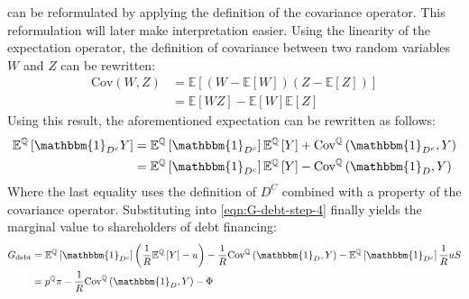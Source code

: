 \documentclass[../main.tex]{subfiles}
\begin{document}
        can be reformulated by applying the definition of the covariance operator.
        This reformulation will later make interpretation easier.
        Using the linearity of the expectation operator,
        the definition of covariance between two random variables $W$ and $Z$ can be rewritten:
            \begin{align}
                \text{Cov}\left(W, Z\right) &= 
                \mathbb{E}\left[
                    (W - \mathbb{E}\left[W\right])
                    (Z - \mathbb{E}\left[Z\right])
                \right] \nonumber\\
                &=
                \mathbb{E}\left[WZ\right]
                - \mathbb{E}\left[W\right] \mathbb{E}\left[Z\right] \nonumber
            \end{align}
        Using this result, the aforementioned expectation can be rewritten as follows:
            \begin{align}
                \mathbb{E}^{\mathbb{Q}}\left[
                    \mathbbm{1}_{D^{c}}Y
                \right]
                &=
                \mathbb{E}^{\mathbb{Q}}\left[\mathbbm{1}_{D^{c}}\right] 
                \mathbb{E}^{\mathbb{Q}}\left[Y\right] 
                + 
                \text{Cov}^{\mathbb{Q}}\left(\mathbbm{1}_{D^{c}}, Y\right) 
                \nonumber\\
                &=
                \mathbb{E}^{\mathbb{Q}}\left[\mathbbm{1}_{D^{c}}\right] 
                \mathbb{E}^{\mathbb{Q}}\left[Y\right] 
                - 
                \text{Cov}^{\mathbb{Q}}\left(\mathbbm{1}_{D}, Y\right) 
            \end{align}
        Where the last equality uses the definition of $D^{C}$ combined with a property of the covariance operator.
        Substituting into \cref{eqn:G-debt-step-4} finally yields the marginal value to shareholders of debt financing:
            \begin{align}
                G_{\text{debt}} &=
                \mathbb{E}^{\mathbb{Q}}\left[\mathbbm{1}_{D^{c}}\right] 
                \left(
                    \discountfactor
                    \mathbb{E}^{\mathbb{Q}}\left[Y\right] 
                    - u
                \right)
                -
                \discountfactor
                \text{Cov}^{\mathbb{Q}}\left(\mathbbm{1}_{D}, Y\right) 
                - 
                \mathbb{E}^{\mathbb{Q}}\left[
                    \mathbbm{1}_{D^{c}}
                \right] \discountfactor u S
                \nonumber \\
                &= 
                p^{\mathbb{Q}} \pi 
                - \discountfactor 
                \text{Cov}^{\mathbb{Q}}\left(
                    \mathbbm{1}_{D}, 
                    Y
                \right) 
                - \Phi
                \label{eqn:marginal-shareholder-value-debt-financing}
            \end{align}
\end{document}
